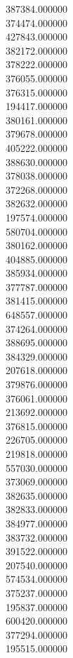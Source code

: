 387384.000000\\
374474.000000\\
427843.000000\\
382172.000000\\
378222.000000\\
376055.000000\\
376315.000000\\
194417.000000\\
380161.000000\\
379678.000000\\
405222.000000\\
388630.000000\\
378038.000000\\
372268.000000\\
382632.000000\\
197574.000000\\
580704.000000\\
380162.000000\\
404885.000000\\
385934.000000\\
377787.000000\\
381415.000000\\
648557.000000\\
374264.000000\\
388695.000000\\
384329.000000\\
207618.000000\\
379876.000000\\
376061.000000\\
213692.000000\\
376815.000000\\
226705.000000\\
219818.000000\\
557030.000000\\
373069.000000\\
382635.000000\\
382833.000000\\
384977.000000\\
383732.000000\\
391522.000000\\
207540.000000\\
574534.000000\\
375237.000000\\
195837.000000\\
600420.000000\\
377294.000000\\
195515.000000\\
